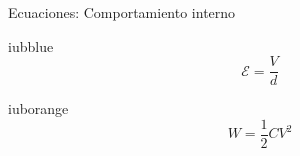\documentclass[aspectratio=169,11pt,xcolor={table}]{beamer}
\begin{document}
\begin{frame}{Ecuaciones: Comportamiento interno}
\begin{cajaplana}{iubblue}
\centering
{\large
\begin{equation*}
  \mathcal{E} = \frac{V}{d}
\end{equation*}
}
\end{cajaplana}
\vspace{1mm}
\begin{cajaplana}{iuborange}
\centering
{\large
\begin{equation*}
  W = \frac{1}{2} C V^{2}
\end{equation*}
}
\end{cajaplana}
\end{frame}
\end{document}
